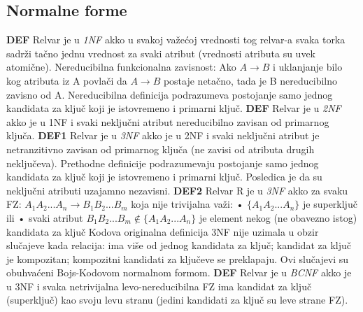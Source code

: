 \documentclass{article}
\begin{document}
\subsection{Normalne forme}
\textbf{DEF} Relvar je u \textit{1NF} akko u svakoj važećoj
vrednosti tog relvar-a svaka torka sadrži tačno jednu
vrednost za svaki atribut (vrednosti atributa su uvek
atomične).
\vspace{0.2cm}\newline
Nereducibilna funkcionalna zavisnost: Ako $A \rightarrow B$ i
uklanjanje bilo kog atributa iz A povlači da $A \rightarrow
B$ postaje netačno, tada je B nereducibilno zavisno od A.
Nereducibilna definicija podrazumeva postojanje samo jednog
kandidata za ključ koji je istovremeno i primarni ključ.
\newline
\textbf{DEF} Relvar je u \textit{2NF} akko je u 1NF i svaki
neključni
atribut nereducibilno zavisan od primarnog ključa.
\vspace{0.2cm}\newline
\textbf{DEF1} Relvar je u \textit{3NF} akko je u 2NF i svaki
neključni atribut je netranzitivno zavisan od primarnog
ključa (ne zavisi od atributa drugih neključeva). 
\newline
Prethodne definicije podrazumevaju postojanje samo jednog
kandidata za ključ koji je istovremeno i primarni ključ.
Posledica je da su neključni atributi uzajamno nezavisni.
\newline
\textbf{DEF2} Relvar R je u \textit{3NF} akko za svaku FZ: 
$A_1A_2...A_n \rightarrow B_1B_2...B_m$ koja nije trivijalna
važi:
\newline \hspace*{0.4cm}• $\{A_1A_2...A_n\}$ je superključ
ili
\newline \hspace*{0.4cm}• svaki atribut $B_1B_2...B_m \notin
\{A_1A_2...A_n\}$ je element nekog (ne obavezno istog)
kandidata za ključ
\newline
Kodova originalna definicija 3NF nije uzimala u obzir
slučajeve kada relacija: ima više od jednog kandidata za
ključ; kandidat za ključ je kompozitan; kompozitni kandidati
za ključeve se preklapaju. Ovi slučajevi su obuhvaćeni
Bojs-Kodovom normalnom formom.
\vspace{0.2cm} \newline
\textbf{DEF} Relvar je u \textit{BCNF} akko je u 3NF i svaka
netrivijalna levo-nereducibilna FZ ima kandidat za ključ
(superključ) kao svoju levu stranu (jedini kandidati za ključ
su leve strane FZ). 
\newline
\end{document}
